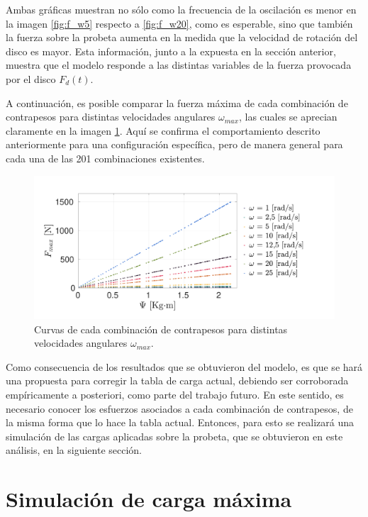 Ambas gráficas muestran no sólo como la frecuencia de la oscilación es menor en la imagen \ref{fig:f_w5} respecto a \ref{fig:f_w20}, como es esperable, sino que también la fuerza sobre la probeta aumenta en la medida que la velocidad de rotación del disco es mayor. Esta información, junto a la expuesta en la sección anterior, muestra que el modelo responde a las distintas variables de la fuerza provocada por el disco $F_d(t)$. 

A continuación, es posible comparar la fuerza máxima de cada combinación de contrapesos para distintas velocidades angulares $\omega_{max}$, las cuales se aprecian claramente en la imagen \ref{fig:fs_psi}. Aquí se confirma el comportamiento descrito anteriormente para una configuración específica, pero de manera general para cada una de las 201 combinaciones existentes. 

\begin{figure}
\centering
\includegraphics[width=1\linewidth, trim={1cm 1cm 4cm 1cm}, clip]{Imagenes/fs_psi2.pdf}
\caption{Curvas de cada combinación de contrapesos para distintas velocidades angulares $\omega_{max}$.}
\label{fig:fs_psi}
\end{figure}

Como consecuencia de los resultados que se obtuvieron del modelo, es que se hará una propuesta para corregir la tabla de carga actual, debiendo ser corroborada empíricamente a posteriori, como parte del trabajo futuro. En este sentido, es necesario conocer los esfuerzos asociados a cada combinación de contrapesos, de la misma forma que lo hace la tabla actual. Entonces, para esto se realizará una simulación de las cargas aplicadas sobre la probeta, que se obtuvieron en este análisis, en la siguiente sección. 

\section{Simulación de carga máxima}


